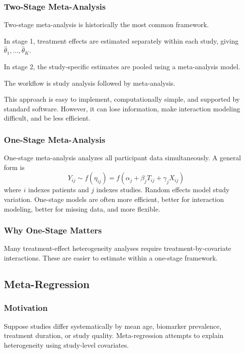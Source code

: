 \documentclass[11pt]{article}
\begin{document}
\subsubsection*{Two-Stage Meta-Analysis}

Two-stage meta-analysis is historically the most common framework.

In stage 1, treatment effects are estimated separately within each study, giving $\hat{\theta}_1,\ldots,\hat{\theta}_K$.

In stage 2, the study-specific estimates are pooled using a meta-analysis model.

The workflow is study analysis followed by meta-analysis.

This approach is easy to implement, computationally simple, and supported by standard software. However, it can lose information, make interaction modeling difficult, and be less efficient.

\subsubsection*{One-Stage Meta-Analysis}

One-stage meta-analysis analyzes all participant data simultaneously.
A general form is
\[Y_{ij}\sim f(\eta_{ij})=f(\alpha_j+\beta_jT_{ij}+\gamma_jX_{ij})\]
where $i$ indexes patients and $j$ indexes studies.
Random effects model study variation.
One-stage models are often more efficient, better for interaction modeling, better for missing data, and more flexible.

\subsubsection*{Why One-Stage Matters}

Many treatment-effect heterogeneity analyses require treatment-by-covariate interactions. These are easier to estimate within a one-stage framework.

\subsection*{Meta-Regression}

\subsubsection*{Motivation}

Suppose studies differ systematically by mean age, biomarker prevalence, treatment duration, or study quality.
Meta-regression attempts to explain heterogeneity using study-level covariates.
\end{document}
